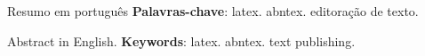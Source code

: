 \documentclass[12pt,oneside,a4paper,brazil]{abntex2}
\begin{document}
\frenchspacing

\pretextual
\imprimircapa
\imprimirfolhaderosto

\begin{resumo}
  Resumo em português
  \vspace{\onelineskip}
  \noindent
  \textbf{Palavras-chave}: latex. abntex. editoração de texto.
\end{resumo}
\begin{resumo}[Abstract]
  \begin{english}
    Abstract in English.
    \vspace{\onelineskip}
    \noindent
    \textbf{Keywords}: latex. abntex. text publishing.
  \end{english}
\end{resumo}

\tableofcontents*
\cleardoublepage

\textual
\cleardoublepage






\postextual

\end{document}
